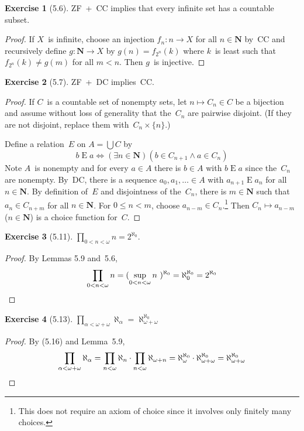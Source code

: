 \documentclass[letterpaper,12pt]{article}
\newcommand{\N}{\boldsymbol{N}}
\newcommand{\al}{\aleph}
\newcommand{\alo}{\al_{\omega}}
\newcommand{\bigunion}{\bigcup}
\newcommand{\mult}{\cdot}
\theoremstyle{definition}
\newtheorem*{exer}{Exercise}
\theoremstyle{remark}
\begin{document}
\begin{exer}[5.6]
ZF~+~CC implies that every infinite set has a countable subset.
\end{exer}
\begin{proof}
If \(X\)~is infinite, choose an injection \(f_n:n\to X\) for all \(n\in\N\) by~CC and recursively define \(g:\N\to X\) by \(g(n)=f_{2^n}(k)\) where \(k\)~is least such that \(f_{2^n}(k)\ne g(m)\) for all \(m<n\). Then \(g\)~is injective.
\end{proof}

\begin{exer}[5.7]
ZF~+~DC implies~CC.
\end{exer}
\begin{proof}
If \(C\)~is a countable set of nonempty sets, let \(n\mapsto C_n\in C\) be a bijection and assume without loss of generality that the~\(C_n\) are pairwise disjoint. (If they are not disjoint, replace them with~\(C_n\times\{n\}\).)

Define a relation~\(E\) on \(A=\bigunion C\) by
\[b\mathrel{E}a\iff(\exists n\in\N)(b\in C_{n+1}\land a\in C_n)\]
Note \(A\)~is nonempty and for every \(a\in A\) there is \(b\in A\) with \(b\mathrel{E}a\) since the~\(C_n\) are nonempty. By~DC, there is a sequence \(a_0,a_1,\ldots\in A\) with \(a_{n+1}\mathrel{E}a_n\) for all \(n\in\N\). By definition of~\(E\) and disjointness of the~\(C_n\), there is \(m\in\N\) such that \(a_n\in C_{n+m}\) for all \(n\in\N\). For \(0\le n<m\), choose \(a_{n-m}\in C_n\).\footnote{This does not require an axiom of choice since it involves only finitely many choices.} Then \(C_n\mapsto a_{n-m}\) (\(n\in\N\)) is a choice function for~\(C\).
\end{proof}

\begin{exer}[5.11]
\(\prod_{0<n<\omega}n=2^{\al_0}\).
\end{exer}
\begin{proof}
By Lemmas 5.9 and~5.6,
\[\prod_{0<n<\omega}n=(\sup_{0<n<\omega}n\ )^{\al_0}=\al_0^{\al_0}=2^{\al_0}\qedhere\]
\end{proof}

\begin{exer}[5.13]
\(\prod_{\alpha<\omega+\omega}\al_{\alpha}=\al_{\omega+\omega}^{\al_0}\)
\end{exer}
\begin{proof}
By (5.16) and Lemma~5.9,
\[\prod_{\alpha<\omega+\omega}\al_{\alpha}=\prod_{n<\omega}\al_n\mult\prod_{n<\omega}\al_{\omega+n}=\alo^{\al_0}\mult\al_{\omega+\omega}^{\al_0}=\al_{\omega+\omega}^{\al_0}\qedhere\]
\end{proof}
\end{document}
